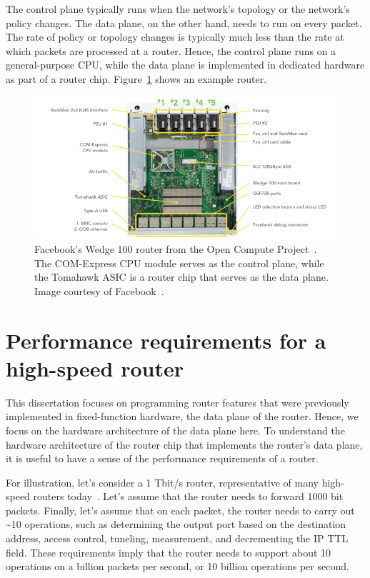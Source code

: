 The control plane typically runs when the network's topology or the network's
policy changes. The data plane, on the other hand, needs to run on every
packet. The rate of policy or topology changes is typically much less than the
rate at which packets are processed at a router. Hence, the control plane runs
on a general-purpose CPU, while the data plane is implemented in dedicated
hardware as part of a router chip.  Figure~\ref{fig:router_box} shows
an example router.

\begin{figure}
\centering
\includegraphics[width=\textwidth]{wedge100.png}
\caption{Facebook's Wedge 100 router from the Open Compute Project~\cite{ocp}.
The COM-Express CPU module serves as the control plane, while the Tomahawk ASIC
is a router chip that serves as the data plane. Image courtesy of
Facebook~\cite{wedge100}.}
\label{fig:router_box}
\end{figure}

\section{Performance requirements for a high-speed router}
This dissertation focuses on programming router features that were previously
implemented in fixed-function hardware, \ie the data plane of the router.
Hence, we focus on the hardware architecture of the data plane here.  To
understand the hardware architecture of the router chip that implements the
router's data plane, it is useful to have a sense of the performance
requirements of a router.

For illustration, let's consider a 1 Tbit/s router, representative of many
high-speed routers today~\cite{trident2, tomahawk, tomahawk2}. Let's assume
that the router needs to forward 1000 bit packets. Finally, let's assume that
on each packet, the router needs to carry out \textasciitilde10 operations,
such as determining the output port based on the destination address, access
control, tuneling, measurement, and decrementing the IP TTL field. These
requirements imply that the router needs to support about 10 operations on a
billion packets per second, or 10 billion operations per second.

